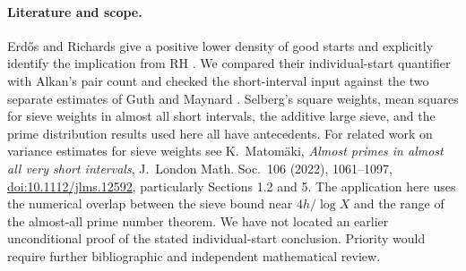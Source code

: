 \documentclass[11pt,a4paper]{article}
\begin{document}
\paragraph{Literature and scope.}
Erd\H{o}s and Richards give a positive lower density of good
starts and explicitly identify the implication from RH \cite[p.~111]{er}.
We compared their individual-start quantifier with Alkan's pair
count \cite[Corollary~1]{alkan} and checked the short-interval input
against the two separate estimates of Guth and Maynard \cite{gm}.
Selberg's square weights, mean squares for sieve weights in almost
all short intervals, the additive large sieve, and the prime
distribution results used here all have antecedents. For related work
on variance estimates for sieve weights see K.~Matom\"aki,
\emph{Almost primes in almost all very short intervals},
J.~London Math. Soc.\ 106 (2022), 1061--1097,
\href{https://doi.org/10.1112/jlms.12592}{doi:10.1112/jlms.12592},
particularly Sections 1.2 and 5.
The application here uses the numerical overlap between the
sieve bound near $4h/\log X$ and the range of the almost-all prime
number theorem. We have not located an earlier unconditional proof
of the stated individual-start conclusion. Priority would require
further bibliographic and independent mathematical review.
\end{document}

